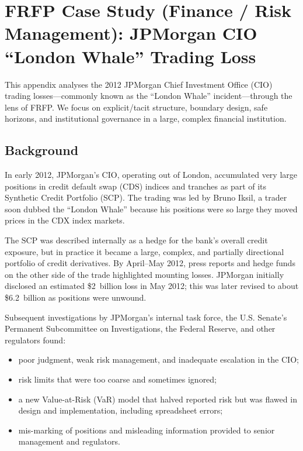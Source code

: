
\section{FRFP Case Study (Finance / Risk Management):
  JPMorgan CIO “London Whale” Trading Loss}
\label{app:frfp-london-whale}

This appendix analyses the 2012 JPMorgan Chief Investment Office (CIO)
trading losses---commonly known as the ``London Whale'' incident---through
the lens of FRFP.
We focus on explicit/tacit structure, boundary design, safe horizons, and
institutional governance in a large, complex financial institution.

\subsection{Background}

In early 2012, JPMorgan’s CIO, operating out of London, accumulated very
large positions in credit default swap (CDS) indices and tranches as part of
its Synthetic Credit Portfolio (SCP).
The trading was led by Bruno Iksil, a trader soon dubbed the ``London
Whale'' because his positions were so large they moved prices in the
CDX index markets.

The SCP was described internally as a hedge for the bank’s overall credit
exposure, but in practice it became a large, complex, and partially
directional portfolio of credit derivatives.
By April–May 2012, press reports and hedge funds on the other side of the
trade highlighted mounting losses.
JPMorgan initially disclosed an estimated \$2~billion loss in May 2012; this
was later revised to about \$6.2~billion as positions were unwound.

Subsequent investigations by JPMorgan’s internal task force, the U.S.
Senate’s Permanent Subcommittee on Investigations, the Federal Reserve, and
other regulators found:

\begin{itemize}
  \item poor judgment, weak risk management, and inadequate escalation in the
        CIO;
  \item risk limits that were too coarse and sometimes ignored;
  \item a new Value-at-Risk (VaR) model that halved reported risk but was
        flawed in design and implementation, including spreadsheet errors;
  \item mis-marking of positions and misleading information provided to
        senior management and regulators.
\end{itemize}


